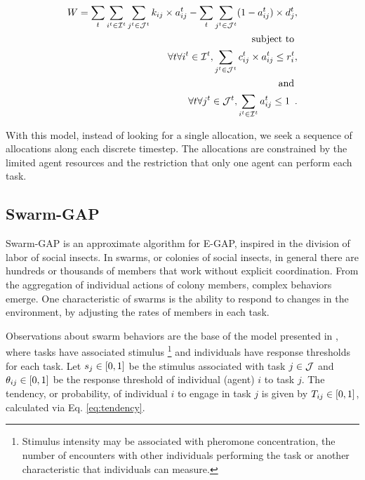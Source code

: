 \documentclass[conference]{IEEEtran}
\begin{document}
\begin{equation}
\label{eq:egap-total-reward}
\begin{split}
W = \sum_t \sum_{i^t \in \agentset^t} \sum_{j^t \in \taskset^t} \agtcap{i}{j} \times a_{ij}^t - 
\sum_t \sum_{j^t \in \taskset^t}(1 - a_{ij}^t) \times d_j^t ,\\
\text{ subject to }\\
\forall t \forall i^t \in \agentset^t, \sum_{j^t \in \taskset^t} \rescspt{i}{j}^t \times a_{ij}^t \leq \agtres{i}^t ,\\
\text{ and }\\
\forall t \forall j^t \in \taskset^t, \sum_{i^t \in \agentset^t} a_{ij}^t \leq 1 \enspace .
\end{split}
\end{equation}

With this model, instead of looking for a single allocation, we seek a sequence of allocations along each discrete timestep. The allocations are constrained by the limited agent resources and the restriction that only one agent can perform each task.

\subsection{Swarm-GAP}
\label{sec:swarmgap}

Swarm-GAP is an approximate algorithm for E-GAP, inspired in the division of labor of social insects. In swarms, or colonies of social insects, in general there are hundreds or thousands of members that work without explicit coordination. From the aggregation of individual actions of colony members, complex behaviors emerge. One characteristic of swarms is the ability to respond to changes in the environment, by adjusting the rates of members in each task.

Observations about swarm behaviors are the base of the model presented in \cite{Theraulaz+1998}, where tasks have associated stimulus \footnote{Stimulus intensity may be associated with pheromone concentration, the number of encounters with other individuals performing the task or another characteristic that individuals can measure.} and individuals have response thresholds for each task. Let $s_j \in [0,1]$ be the stimulus associated with task $j \in \mathcal{J}$ and $\theta_{ij} \in [0,1]$ be the response threshold of individual (agent) $i$ to task $j$. The tendency, or probability, of individual $i$ to engage in task $j$ is given by $T_{ij} \in [0,1]$, calculated via Eq. \ref{eq:tendency}.
\end{document}
